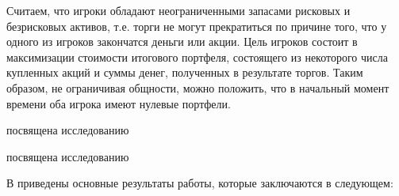 Считаем, что игроки обладают неограниченными запасами рисковых и безрисковых активов, т.е. торги не могут прекратиться по причине того, что у одного из игроков закончатся деньги или акции.
Цель игроков состоит в максимизации стоимости итогового портфеля, состоящего из некоторого числа купленных акций и суммы денег, полученных в результате торгов.
Таким образом, не ограничивая общности, можно положить, что в начальный момент времени оба игрока имеют нулевые портфели.

 посвящена исследованию 

 посвящена исследованию 

В  приведены основные результаты работы, которые заключаются в следующем:





